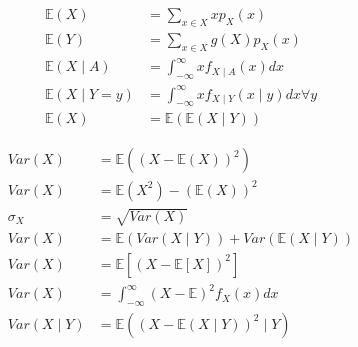 \documentclass[10pt]{article}
\begin{document}
\begin{multicols}{2}
\begin{equation*}
  \boxed{
    \begin{aligned}
      \mathbb{E}(X) &= \sum\limits_{x \in X} x p_X(x) \\
      \mathbb{E}(Y) &= \sum\limits_{x \in X} g(X) p_X(x) \\
      \mathbb{E}(X\mid A) &= \int_{-\infty}^\infty xf_{X\mid A}(x) dx \\
      \mathbb{E}(X\mid Y=y) &= \int _{-\infty}^\infty xf_{X\mid
        Y}(x\mid y) dx \forall y \\
      \mathbb{E}(X) &= \mathbb{E}(\mathbb{E}(X\mid Y))
    \end{aligned}
  }
\end{equation*}

\columnbreak

\begin{equation*}
  \boxed{
    \begin{aligned}
      Var(X) &= \mathbb{E}((X - \mathbb{E}(X))^2) \\
      Var(X) &= \mathbb{E}(X^2) - (\mathbb{E}(X))^2 \\
      \sigma_X &= \sqrt{Var(X)} \\
      Var(X) &= \mathbb{E}(Var(X\mid Y)) + Var(\mathbb{E}(X\mid Y)) \\
      Var(X) &= \mathbb{E}[(X - \mathbb{E}[X])^2] \\
      Var(X) &= \int_{-\infty}^\infty (X - \mathbb{E})^2 f_X(x) dx \\
      Var(X\mid Y) &= \mathbb{E}((X - \mathbb{E}(X\mid Y))^2\mid Y)
    \end{aligned}
  }
\end{equation*}
\end{multicols}












\pagebreak
\end{document}
